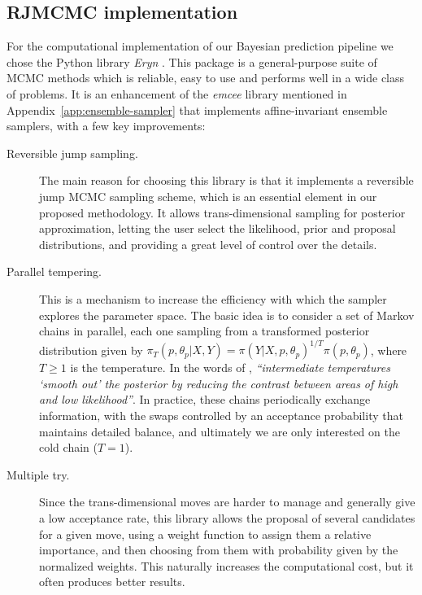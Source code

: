 \subsection{RJMCMC implementation}

For the computational implementation of our Bayesian prediction pipeline we chose the Python library \textit{Eryn} \citep{karnesis2023eryn}. This package is a general-purpose suite of MCMC methods which is reliable, easy to use and performs well in a wide class of problems. It is an enhancement of the \textit{emcee} library mentioned in Appendix~\ref{app:ensemble-sampler} that implements affine-invariant ensemble samplers, with a few key improvements:

\begin{description}
  \item[Reversible jump sampling.] The main reason for choosing this library is that it implements a reversible jump MCMC sampling scheme, which is an essential element in our proposed methodology. It allows trans-dimensional sampling for posterior approximation, letting the user select the likelihood, prior and proposal distributions, and providing a great level of control over the details.

  \item[Parallel tempering.] This is a mechanism to increase the efficiency with which the sampler explores the parameter space. The basic idea is to consider a set of Markov chains in parallel, each one sampling from a transformed posterior distribution given by \(\pi_T(p, \theta_p|X,Y) = \pi(Y|X, p, \theta_p)^{1/T}\pi(p, \theta_p)\), where \(T\geq 1\) is the temperature. In the words of \citet{karnesis2023eryn}, \textit{``intermediate temperatures `smooth out' the posterior by reducing the contrast between areas of high and low likelihood''}. In practice, these chains periodically exchange information, with the swaps controlled by an acceptance probability that maintains detailed balance, and ultimately we are only interested on the cold chain (\(T=1\)).

  \item[Multiple try.] Since the trans-dimensional moves are harder to manage and generally give a low acceptance rate, this library allows the proposal of several candidates for a given move, using a weight function to assign them a relative importance, and then choosing from them with probability given by the normalized weights. This naturally increases the computational cost, but it often produces better results.
\end{description}

